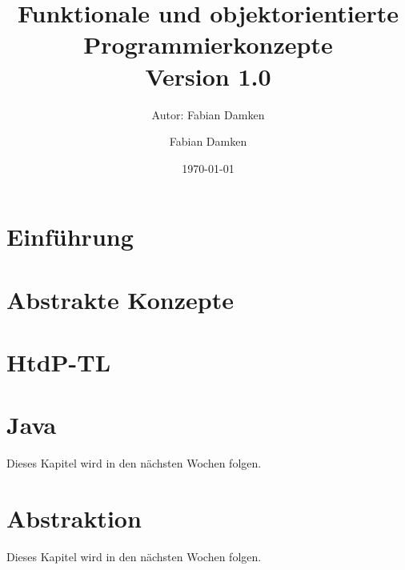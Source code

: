 \documentclass[a4paper, 11pt, accentcolor = tud3b]{tudreport}
\title{Funktionale und objektorientierte Programmierkonzepte \\ Version 1.0}
\subtitle{Autor: Fabian Damken}
\author{Fabian Damken}
\date{\today}
\providecommand{\racket}{HtdP-TL}
\begin{document}
	

    \maketitle
    \tableofcontents
    \listoftodos

    \chapter{Einführung}
	    \label{c:einfuehrung}
    
        

	\chapter{Abstrakte Konzepte}
		\label{c:abstrakte_konzepte}
	
		

    \chapter{\racket}
	    \label{c:racket}
    
        

    
    \chapter{Java}
    	\label{c:java}
    	
    	Dieses Kapitel wird in den nächsten Wochen folgen.
    
    
    \chapter{Abstraktion}
    	\label{c:abstraktion}
    	
    	Dieses Kapitel wird in den nächsten Wochen folgen.
    

    
    
\end{document}

